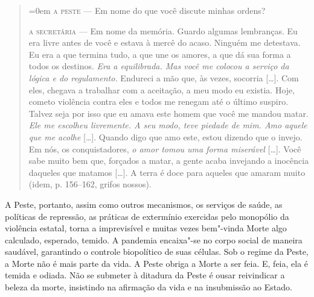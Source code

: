 \begin{quote}\parindent=0em
\textsc{a peste} --- Em nome do que você discute minhas ordens?

\textsc{a secretária} ---
Em nome da memória. Guardo algumas lembranças. Eu era livre antes de
você e estava à mercê do acaso. Ninguém me detestava. Eu era a que
termina tudo, a que une os amores, a que dá sua forma a todos os
destinos. \textit{Era a equilibrada. Mas você me colocou a serviço da
lógica e do regulamento.} Endureci a mão que, às vezes, socorria
{[}\ldots{}{]}. Com eles, chegava a trabalhar com a aceitação, a meu modo eu
existia. Hoje, cometo violência contra eles e todos me renegam até o
último suspiro. Talvez seja por isso que eu amava este homem que você me
mandou matar. \textit{Ele me escolheu livremente. A seu modo, teve
piedade de mim. Amo aquele que me acolhe} {[}\ldots{}{]}. Quando digo que amo
este, estou dizendo que o invejo. Em nós, os conquistadores, \textit{o
amor tomou uma forma miserável} {[}\ldots{}{]}. Você sabe muito bem que,
forçados a matar, a gente acaba invejando a inocência daqueles que
matamos {[}\ldots{}{]}. A terra é doce para aqueles que amaram muito (idem,
p. 156--162, grifos nossos).
\end{quote}

A Peste, portanto, assim como outros mecanismos, os serviços de saúde,
as políticas de repressão, as práticas de extermínio exercidas pelo
monopólio da violência estatal, torna a imprevisível e muitas vezes
bem"-vinda Morte algo calculado, esperado, temido. A pandemia encaixa"-se
no corpo social de maneira saudável, garantindo o controle biopolítico
de suas células. Sob o regime da Peste, a Morte não é mais parte da
vida. A Peste obriga a Morte a ser feia. E, feia, ela é temida e odiada.
Não se submeter à ditadura da Peste é ousar reivindicar a beleza da
morte, insistindo na afirmação da vida e na insubmissão ao Estado.

